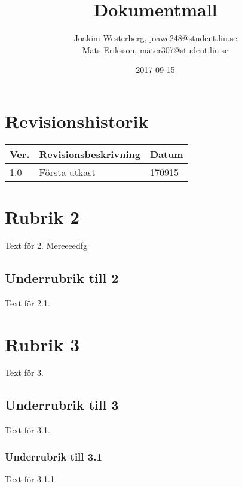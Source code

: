 \documentclass{TDP003mall}
\author{Joakim Westerberg, \url{joawe248@student.liu.se}\\
  Mats Eriksson, \url{mater307@student.liu.se}}
\title{Dokumentmall}
\date{2017-09-15}
\begin{document}
\projectpage
\section{Revisionshistorik}
\begin{table}[!h]
\begin{tabularx}{\linewidth}{|l|X|l|}
\hline
Ver. & Revisionsbeskrivning & Datum \\\hline
1.0 & Första utkast & 170915 \\\hline
\end{tabularx}
\end{table}


\section{Rubrik 2}
Text för 2.  Mereeeedfg

\subsection{Underrubrik till 2}
Text för 2.1.

\section{Rubrik 3}
Text för 3.

\subsection{Underrubrik till 3}
Text för 3.1.

\subsubsection{Underrubrik till 3.1}
Text för 3.1.1
\end{document}
